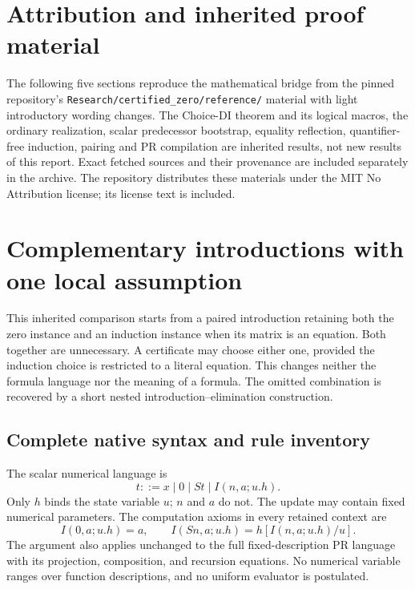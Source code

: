 \documentclass[11pt]{article}
\theoremstyle{definition}
\theoremstyle{remark}
\begin{document}
\appendix
\section{Attribution and inherited proof material}
\label{sec:attribution}

The following five sections reproduce the mathematical bridge from the
pinned repository's \texttt{Research/certified\_zero/reference/} material
with light introductory wording changes. The Choice-DI theorem and its
logical macros, the ordinary realization, scalar predecessor bootstrap,
equality reflection, quantifier-free induction, pairing and PR compilation
are inherited results, not new results of this report. Exact fetched
sources and their provenance are included separately in the archive.
The repository distributes these materials under the MIT No Attribution
license; its license text is included.


\section{Complementary introductions with one local assumption}
\label{sec:choice-introduction}

This inherited comparison starts from a paired introduction retaining both the zero instance and an
induction instance when its matrix is an equation. Both together are
unnecessary. A certificate may choose either one, provided the induction
choice is restricted to a literal equation. This changes neither the
formula language nor the meaning of a formula. The omitted combination
is recovered by a short nested introduction--elimination construction.

\subsection{Complete native syntax and rule inventory}

The scalar numerical language is
\[
 t::=x\mid0\mid St\mid I(n,a;u.h).
\]
Only $h$ binds the state variable $u$; $n$ and $a$ do not.
The update may contain fixed numerical parameters. The computation
axioms in every retained context are
\[
 I(0,a;u.h)=a,\qquad
 I(Sn,a;u.h)=h[I(n,a;u.h)/u].
 \tag{I0, IS}\label{eq:choice-computations}
\]
The argument also applies unchanged to the full fixed-description PR
language with its projection, composition, and recursion equations.
No numerical variable ranges over function descriptions, and no uniform
evaluator is postulated.
\end{document}
